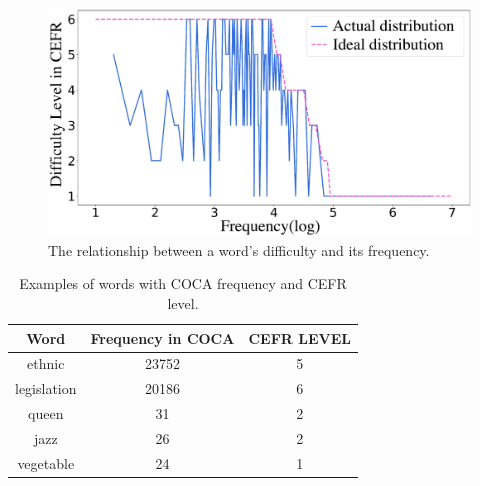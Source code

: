 \begin{figure}[th]
	\centering
	\includegraphics[width=\linewidth]{pic/freqEx.eps}  
	\caption{\label{tab:freqeg} The relationship between a word's difficulty and its frequency.}
	
	\label{fig:freqeg}
\end{figure}

\begin{table}[th]
	\scriptsize
\begin{center}
		\begin{tabular}{ccc}
		\hline
		\textbf{Word} & \textbf{Frequency in COCA} & \textbf{CEFR LEVEL} \\ \hline
		ethnic & 23752 & 5 \\ 
		legislation & 20186 & 6 \\ 
		queen & 31 & 2 \\ 
		jazz & 26 & 2 \\ 
		vegetable & 24 & 1 \\ \hline
	\end{tabular}
\end{center}
\caption{\label{tab:words} Examples of words with COCA frequency and CEFR level.}
\end{table}

